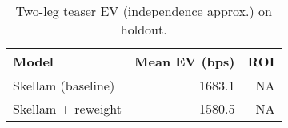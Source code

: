 \begin{table}

\caption{\label{tab:unnamed-chunk-2}Two-leg teaser EV (independence approx.) on holdout.}
\centering
\begin{tabular}[t]{lrr}
\toprule
Model & Mean EV (bps) & ROI\\
\midrule
Skellam (baseline) & 1683.1 & NA\\
Skellam + reweight & 1580.5 & NA\\
\bottomrule
\end{tabular}
\end{table}
